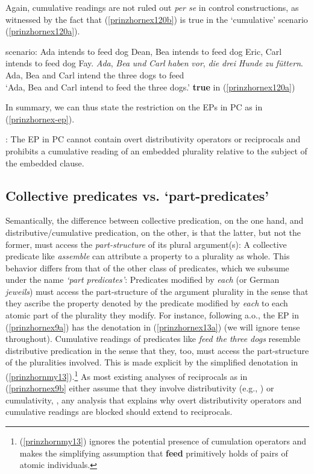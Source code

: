\documentclass[output=paper,colorlinks,citecolor=brown,
]{langscibook}
\begin{document}
Again, cumulative readings are not ruled out \textit{per se} in control constructions, as witnessed by the fact that (\ref{prinzhornex120b}) is true in the `cumulative' scenario (\ref{prinzhornex120a}).

\ea \label{prinzhornex120}
\ea \label{prinzhornex120a} {\sc scenario: }  Ada intends to feed dog Dean, Bea intends to feed dog Eric, Carl intends to feed dog Fay.
\ex \gll \textit{Ada}, \textit{Bea} \textit{und} \textit{Carl} \textit{haben} \textit{vor}, \textit{die} \textit{drei} \textit{Hunde}  \textit{zu} \textit{f\"{u}ttern}.\\
   Ada, Bea and Carl intend {} the three dogs  to feed \\
   \glt `Ada, Bea and Carl intend to feed the three dogs.' \hfill \textbf{true} in (\ref{prinzhornex120a}) \label{prinzhornex120b}
\z \z

In summary, we can thus state the restriction on the EPs in PC as in (\ref{prinzhornex-ep}).  


:  The EP in PC cannot contain overt distributivity operators or reciprocals and prohibits a cumulative reading of an embedded plurality relative to the subject of the embedded clause. \label{prinzhornex-ep} \z

\subsection{Collective predicates vs. `part-predicates'}\label{prinzhornsec:2.2}

Semantically, the difference between collective predication, on the one hand,  and distributive/cumulative predication, on the other, is that the latter, but not the former, must access the {\it part-structure} of its plural argument(s): A collective predicate like {\it assemble} can attribute a property to a plurality as whole. This behavior differs from that of the other class of predicates, which we subsume under the name \textit{`part predicates'}:  Predicates modified by {\it each} (or German {\it jeweils}) must access the part-structure of the argument plurality in the sense that they ascribe the property denoted by the predicate modified by \textit{each} to each atomic part of the plurality they modify.  For instance, following \citealt{Link:1987} a.o., the EP in (\ref{prinzhornex9a}) has the denotation in (\ref{prinzhornex13a}) (we will ignore tense throughout). Cumulative readings of predicates like \textit{feed the three dogs} resemble distributive predication in the sense that they, too, must access the part-structure of the pluralities involved. This is made explicit by the simplified denotation in (\ref{prinzhornmy13}).\footnote{(\ref{prinzhornmy13}) ignores the potential presence of cumulation operators and makes the simplifying assumption that {\bf feed} primitively holds of pairs of atomic individuals.} 
As most existing analyses of reciprocals as in (\ref{prinzhornex9b} either assume that they involve distributivity (e.g., \citealt{Heim:1991}) or cumulativity, \citep{Beck:2001}, any analysis that explains why overt distributivity operators and cumulative readings are blocked should extend to reciprocals.
\end{document}
